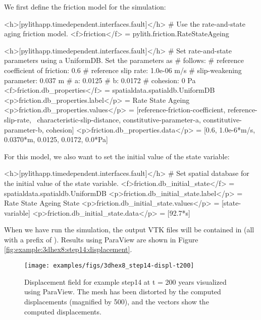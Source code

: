 We first define the friction model for the simulation:
\begin{cfg}
<h>[pylithapp.timedependent.interfaces.fault]</h>
# Use the rate-and-state aging friction model.
<f>friction</f> = pylith.friction.RateStateAgeing

<h>[pylithapp.timedependent.interfaces.fault]</h>
# Set rate-and-state parameters using a UniformDB. Set the parameters as
# follows:
# reference coefficient of friction: 0.6
# reference slip rate: 1.0e-06 m/s
# slip-weakening parameter: 0.037 m
# a: 0.0125
# b: 0.0172
# cohesion: 0 Pa
<f>friction.db_properties</f> = spatialdata.spatialdb.UniformDB
<p>friction.db_properties.label</p> = Rate State Ageing
<p>friction.db_properties.values</p> = [reference-friction-coefficient, reference-slip-rate, \
  characteristic-slip-distance, constitutive-parameter-a, constitutive-parameter-b, cohesion]
<p>friction.db_properties.data</p> = [0.6, 1.0e-6*m/s, 0.0370*m, 0.0125, 0.0172, 0.0*Pa]
\end{cfg}
For this model, we also want to set the initial value of the state
variable:
\begin{cfg}
<h>[pylithapp.timedependent.interfaces.fault]</h>
# Set spatial database for the initial value of the state variable.
<f>friction.db_initial_state</f> = spatialdata.spatialdb.UniformDB
<p>friction.db_initial_state.label</p> = Rate State Ageing State
<p>friction.db_initial_state.values</p> = [state-variable]
<p>friction.db_initial_state.data</p> = [92.7*s]
\end{cfg}
When we have run the simulation, the output VTK files will be contained
in \filename{examples/3d/hex8/output} (all with a prefix of ).
Results using ParaView are shown in Figure \vref{fig:example:3dhex8:step14:displacement}.

\begin{figure}
  \texttt{[image: examples/figs/3dhex8\_step14-displ-t200]}
  \caption{Displacement field for example step14 at t = 200 years visualized
    using ParaView. The mesh has been distorted by the computed displacements
    (magnified by 500), and the vectors show the computed displacements.}
  \label{fig:example:3dhex8:step14:displacement}
\end{figure}

